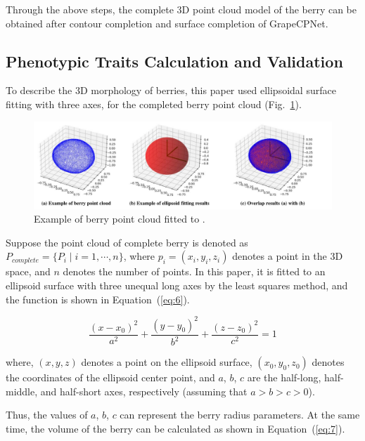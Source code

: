 \documentclass[12pt]{article}
\begin{document}
Through the above steps, the complete 3D point cloud model of the berry can be obtained after contour completion and surface completion of GrapeCPNet.

\subsection{Phenotypic Traits Calculation and Validation}

To describe the 3D morphology of berries, this paper used ellipsoidal surface fitting with three axes, for the completed berry point cloud (Fig.~\ref{fig:raw16}).

\begin{figure}[hbt!]
    \centering
    \includegraphics[width=1\textwidth]{figures/Figure11.pdf}
    \caption{Example of berry point cloud fitted to .}
    \label{fig:raw16}
\end{figure}


Suppose the point cloud of  complete berry is denoted as $P_{complete}=\{P_i \mid i=1, \cdots,n\}$, where $p_i=(x_i,y_i,z_i)$ denotes a point in the 3D space, and $n$ denotes the number of points. 
In this paper, it is fitted to an ellipsoid surface with three unequal long axes by the least squares method, and the function is shown in Equation~(\ref{eq:6}).

\begin{equation}
    \frac{(x-x_0)^2}{a^2} + \frac{(y-y_0)^2}{b^2} + \frac{(z-z_0)^2}{c^2} = 1
    \label{eq:6}
\end{equation}

{\raggedright where, $(x,y,z)$ denotes a point on the ellipsoid surface, $(x_0,y_0,z_0)$ denotes the coordinates of the ellipsoid center point, and $a$, $b$, $c$ are the half-long, half-middle, and half-short axes, respectively (assuming that $a>b>c>0$). }

Thus, the values of $a$, $b$, $c$ can represent the berry radius parameters. 
At the same time, the volume of the berry can be calculated as shown in Equation~(\ref{eq:7}).
\end{document}
